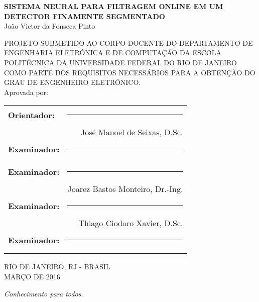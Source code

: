 \begin{titlepage}
	\begin{center}
		{\large \uppercase{\bf{Sistema Neural para Filtragem Online em um Detector Finamente Segmentado}}}\\[0.9cm]
    {João Victor da Fonseca Pinto}\\[0.9cm]
  \end{center}

		{\uppercase{\footnotesize{PROJETO SUBMETIDO AO CORPO DOCENTE DO DEPARTAMENTO 
DE ENGENHARIA ELETRÔNICA E DE COMPUTAÇÃO DA ESCOLA POLITÉCNICA DA UNIVERSIDADE FEDERAL DO RIO 
DE JANEIRO COMO PARTE DOS REQUISITOS NECESSÁRIOS PARA A OBTENÇÃO DO GRAU 
DE ENGENHEIRO ELETRÔNICO.}}}\\[0.3cm]

    {Aprovada por:}

  \begin{flushright}
		\begin{tabular}{lr}
			{\bf Orientador:}& \rule{8cm}{0.4pt} \\ 
					 & José Manoel de Seixas, D.Sc. \\[0.5cm]
			{\bf Examinador:} & \rule{8cm}{0.4pt} \\
					 & %
					 \\[0.5cm]
			{\bf Examinador:}& \rule{8cm}{0.4pt} \\
					 & Joarez Bastos Monteiro, Dr.-Ing. 
					 \\[0.5cm]
			{\bf Examinador:}& \rule{8cm}{0.4pt} \\
					 & Thiago Ciodaro Xavier, D.Sc. 
					 \\[0.5cm]
			{\bf Examinador:}& \rule{8cm}{0.4pt} \\
					 & %
					 \\[0.5cm]
	
		\end{tabular}
	\end{flushright}
  \vfill
  \begin{center}
		\begin{large}
      \uppercase{
			RIO DE JANEIRO, RJ - BRASIL \\
      MARÇO DE 2016}
		\end{large}
  \end{center}
\end{titlepage}

\cleardoublepage

\null
\vfill
\begin{flushright}
  \em{Conhecimento para todos.}\\
\end{flushright}
